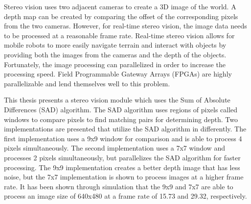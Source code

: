 Stereo vision uses two adjacent cameras to create a 3D image of the world. A depth map can be created by comparing the offset of the corresponding pixels from the two cameras. However, for real-time stereo vision, the image data needs to be processed at a reasonable frame rate. Real-time stereo vision allows for mobile robots to more easily navigate terrain and interact with objects by providing both the images from the cameras and the depth of the objects. Fortunately, the image processing can parallelized in order to increase the processing speed. Field Programmable Gateway Arrays (FPGAs) are highly parallelizable and lend themselves well to this problem.

This thesis presents a stereo vision module which uses the Sum of Absolute Differences (SAD) algorithm. The SAD algorithm uses regions of pixels called windows to compare pixels to find matching pairs for determining depth. Two  implementations are presented that utilize the SAD algorithm in differently. The first implementation uses a 9x9 window for comparison and is able to process 4 pixels simultaneously. The second implementation uses a 7x7 window and processes 2 pixels simultaneously, but parallelizes the SAD algorithm for faster processing. The 9x9 implementation creates a better depth image that has less noise, but the 7x7 implementation is shown to process images at a higher frame rate. It has been shown through simulation that the 9x9 and 7x7 are able to process an image size of 640x480 at a frame rate of 15.73 and 29.32, respectively.

